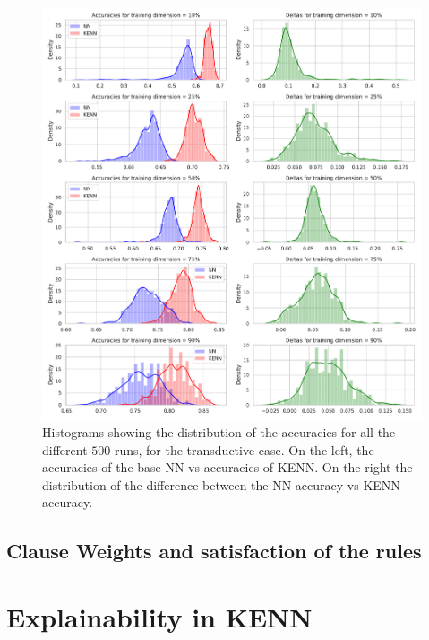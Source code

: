 \begin{figure}
	\centering
	\includegraphics[width=0.95\linewidth]{figures/histograms_transductive.pdf}
	\caption{Histograms showing the distribution of the accuracies for all the different $500$ runs, for the transductive case. On the left, the accuracies of the base NN vs accuracies of KENN. On the right the distribution of the difference between the NN accuracy vs KENN accuracy.}
\end{figure}





\subsection{Clause Weights and satisfaction of the rules}
 
 \section{Explainability in KENN}

